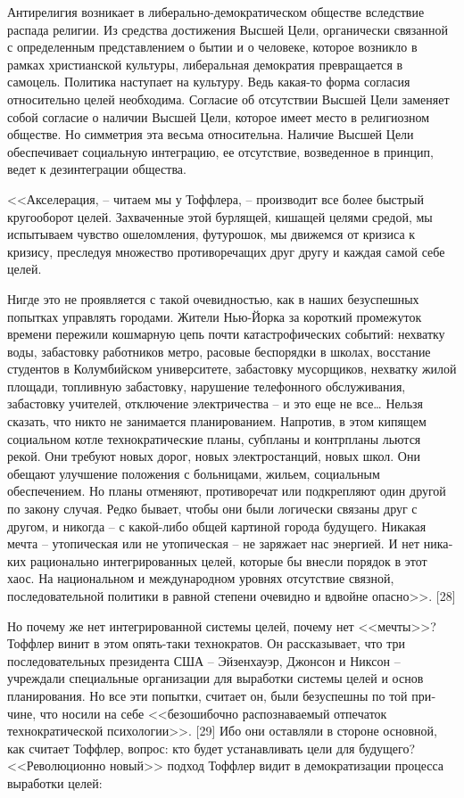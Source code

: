 \documentclass{book}
\begin{document}
Антирелигия возникает в либерально-демократическом об­ществе вследствие распада религии. Из средства достижения Высшей Цели, органически связанной с определенным пред­ставлением о бытии и о человеке, которое возникло в рамках христианской культуры, либеральная демократия превращает­ся в самоцель. Политика наступает на культуру. Ведь какая-то форма согласия относительно целей необходима. Согласие об отсутствии Высшей Цели заменяет собой согласие о наличии Высшей Цели, которое имеет место в религиозном обществе. Но симметрия эта весьма относительна. Наличие Высшей Цели обеспечивает социальную интеграцию, ее отсутствие, возведен­ное в принцип, ведет к дезинтеграции общества.

<<Акселерация, -- читаем мы у Тоффлера, -- производит все более быстрый кругооборот целей. Захваченные этой бурлящей, кишащей целями средой, мы испытываем чувство ошеломле­ния, футурошок, мы движемся от кризиса к кризису, пресле­дуя множество противоречащих друг другу и каждая самой себе целей.

Нигде это не проявляется с такой очевидностью, как в наших безуспешных попытках управлять городами. Жители Нью-Йорка за короткий промежуток времени пережили кошмарную цепь почти катастрофических событий: нехватку воды, забастовку работников метро, расовые беспорядки в школах, восстание студентов в Колумбийском университете, забастовку мусорщиков, нехватку жилой площади, топливную забастовку, нарушение телефонного обслуживания, забастовку учителей, отключение электричества -- и это еще не все\ldots
Нельзя сказать, что никто не занимается планированием. Напротив, в этом кипящем социальном котле технократические планы, субпланы и контрпланы льются рекой. Они требуют новых дорог, новых электростанций, новых школ. Они обещают улучшение положения с больницами, жильем, социальным обеспечением. Но планы отменяют, противоречат или подкрепляют один другой по закону случая. Редко бывает, чтобы они были логически связаны друг с другом, и никогда -- с какой-либо общей картиной города будущего. Никакая мечта -- утопиче­ская или не утопическая -- не заряжает нас энергией. И нет ника­ких рационально интегрированных целей, которые бы внесли порядок в этот хаос. На национальном и международном уров­нях отсутствие связной, последовательной политики в равной степени очевидно и вдвойне опасно>>. [28] 

Но почему же нет интегрированной системы целей, почему нет <<мечты>>? Тоффлер винит в этом опять-таки технократов. Он рассказывает, что три последовательных президента США -- Эйзенхауэр, Джонсон и Никсон -- учреждали специальные орга­низации для выработки системы целей и основ планирования. Но все эти попытки, считает он, были безуспешны по той при­чине, что носили на себе <<безошибочно распознаваемый отпе­чаток технократической психологии>>. [29] Ибо они оставляли в стороне основной, как считает Тоффлер, вопрос: кто будет устанавливать цели для будущего? <<Революционно новый>> под­ход Тоффлер видит в демократизации процесса выработки це­лей:
\end{document}
